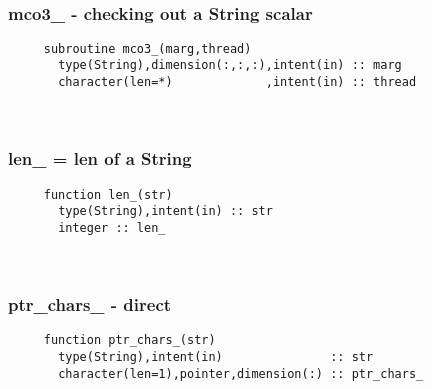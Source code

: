  
\mbox{}\hrulefill\ 
 
  \subsubsection{mco3\_ - checking out a String scalar}

\begin{verbatim} 
     subroutine mco3_(marg,thread)
       type(String),dimension(:,:,:),intent(in) :: marg
       character(len=*)             ,intent(in) :: thread
 \end{verbatim}%
 
 
\mbox{}\hrulefill\ 
 
  \subsubsection{len\_ = len of a String}

\begin{verbatim} 
     function len_(str)
       type(String),intent(in) :: str
       integer :: len_
 \end{verbatim}%
 
 
\mbox{}\hrulefill\ 
 
  \subsubsection{ptr\_chars\_ - direct}

\begin{verbatim} 
     function ptr_chars_(str)
       type(String),intent(in)               :: str
       character(len=1),pointer,dimension(:) :: ptr_chars_
 \end{verbatim}%


